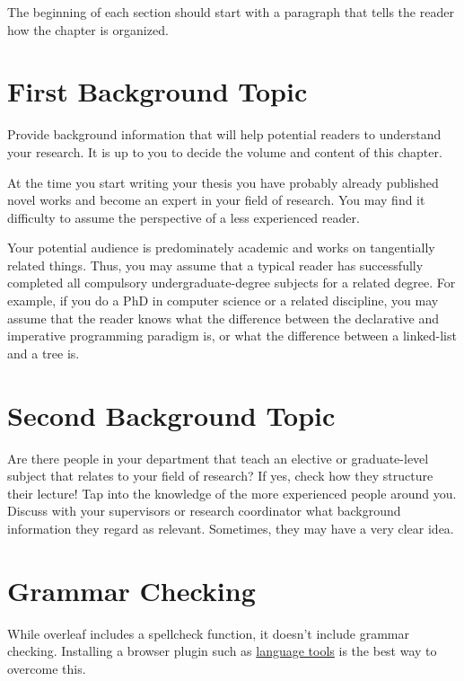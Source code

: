 
\noindent The beginning of each section should start with a paragraph that tells the reader how the chapter is organized.

\section{First Background Topic}
\label{s:First-Background-Topic}

Provide background information that will help potential readers to understand your research. It is up to you to decide the volume and content of this chapter.

At the time you start writing your thesis you have probably already published novel works and become an expert in your field of research. You may find it difficulty to assume the perspective of a less experienced reader.

Your potential audience is predominately academic and works on tangentially related things. Thus, you may assume that a typical reader has successfully completed all compulsory undergraduate-degree subjects for a related degree. For example, if you do a PhD in computer science or a related discipline, you may assume that the reader knows what the difference between the declarative and imperative programming paradigm is, or what the difference between a linked-list and a tree is.

\section{Second Background Topic}
\label{s:Second-Background-Topic}

Are there people in your department that teach an elective or graduate-level subject that relates to your field of research? If yes, check how they structure their lecture! Tap into the knowledge of the more experienced people around you. Discuss with your supervisors or research coordinator what background information they regard as relevant. Sometimes, they may have a very clear idea.

\section{Grammar Checking}
While overleaf includes a spellcheck function, it doesn't include grammar checking. Installing a browser plugin such as \href{https://www.overleaf.com/blog/635-languagetool-a-free-browser-add-on-to-check-your-grammar-and-spelling}{language tools}
is the best way to overcome this.
